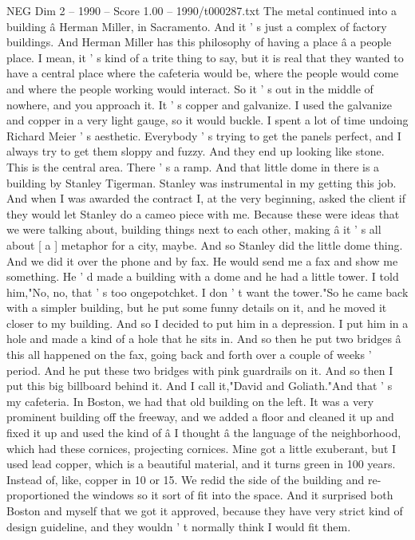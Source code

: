 \begin{textsample}{NEG Dim 2 – 1990 – Score 1.00 – 1990/t000287.txt}
The metal continued into a building â Herman Miller, in Sacramento.
And it ' s just a complex of factory buildings.
And Herman Miller has this philosophy of having a place â a people place.
I mean, it ' s kind of a trite thing to say, but it is real that they wanted to have a central place where the cafeteria would be, where the people would come and where the people working would interact.
So it ' s out in the middle of nowhere, and you approach it.
It ' s copper and galvanize.
I used the galvanize and copper in a very light gauge, so it would buckle.
I spent a lot of time undoing Richard Meier ' s aesthetic.
Everybody ' s trying to get the panels perfect, and I always try to get them sloppy and fuzzy.
And they end up looking like stone.
This is the central area.
There ' s a ramp.
And that little dome in there is a building by Stanley Tigerman.
Stanley was instrumental in my getting this job.
And when I was awarded the contract I, at the very beginning, asked the client if they would let Stanley do a cameo piece with me.
Because these were ideas that we were talking about, building things next to each other, making â it ' s all about [ a ] metaphor for a city, maybe.
And so Stanley did the little dome thing.
And we did it over the phone and by fax.
He would send me a fax and show me something.
He ' d made a building with a dome and he had a little tower.
I told him,"No, no, that ' s too ongepotchket.
I don ' t want the tower."So he came back with a simpler building, but he put some funny details on it, and he moved it closer to my building.
And so I decided to put him in a depression.
I put him in a hole and made a kind of a hole that he sits in.
And so then he put two bridges â this all happened on the fax, going back and forth over a couple of weeks ' period.
And he put these two bridges with pink guardrails on it.
And so then I put this big billboard behind it.
And I call it,"David and Goliath."And that ' s my cafeteria.
In Boston, we had that old building on the left.
It was a very prominent building off the freeway, and we added a floor and cleaned it up and fixed it up and used the kind of â I thought â the language of the neighborhood, which had these cornices, projecting cornices.
Mine got a little exuberant, but I used lead copper, which is a beautiful material, and it turns green in 100 years.
Instead of, like, copper in 10 or 15.
We redid the side of the building and re-proportioned the windows so it sort of fit into the space.
And it surprised both Boston and myself that we got it approved, because they have very strict kind of design guideline, and they wouldn ' t normally think I would fit them.

\end{textsample}
